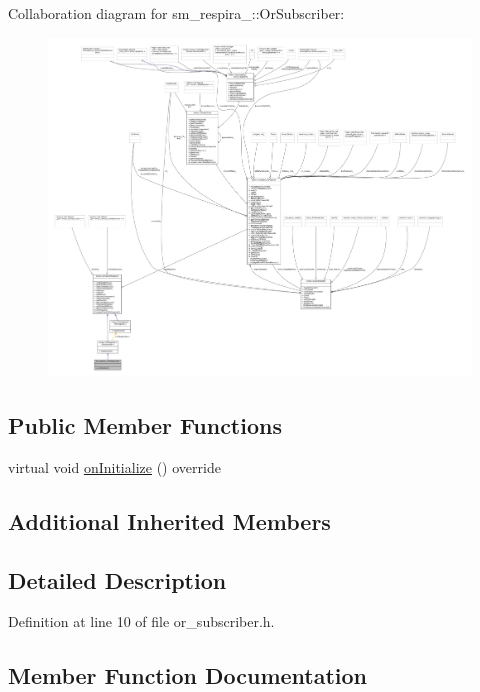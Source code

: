 Collaboration diagram for sm\+\_\+respira\+\_\+:\+:Or\+Subscriber\+:
\nopagebreak
\begin{figure}[H]
\begin{center}
\leavevmode
\includegraphics[width=350pt]{classsm__respira__1_1_1OrSubscriber__coll__graph}
\end{center}
\end{figure}
\subsection*{Public Member Functions}
\begin{DoxyCompactItemize}
\item 
virtual void \hyperlink{classsm__respira__1_1_1OrSubscriber_a085137f52045333e18eea320e52dc1f1}{on\+Initialize} () override
\end{DoxyCompactItemize}
\subsection*{Additional Inherited Members}


\subsection{Detailed Description}


Definition at line 10 of file or\+\_\+subscriber.\+h.



\subsection{Member Function Documentation}
\mbox{\label{classsm__respira__1_1_1OrSubscriber_a085137f52045333e18eea320e52dc1f1}} 
